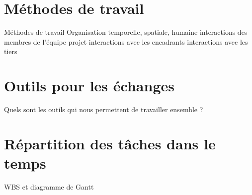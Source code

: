 
\chapter{Méthodes de travail}

Méthodes de travail
Organisation temporelle, spatiale, humaine 
interactions des membres de l’équipe projet
interactions avec les encadrants
interactions avec les tiers

\chapter{Outils pour les échanges}

Quels sont les outils qui nous permettent de  travailler ensemble ?

\chapter{Répartition des tâches dans le temps}


WBS et diagramme de Gantt

